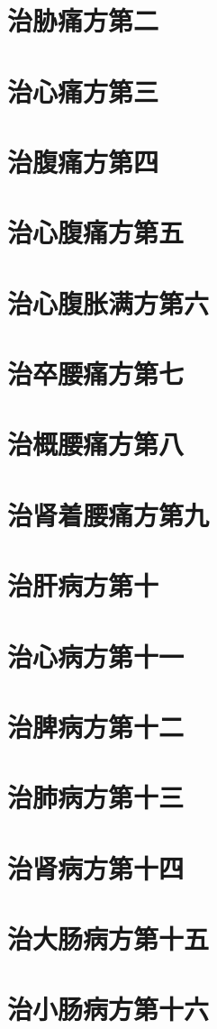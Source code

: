 \documentclass[a4paper,12pt,UTF8,twoside]{ctexbook}
\begin{document}
\chapter{治胁痛方第二}
\chapter{治心痛方第三}
\chapter{治腹痛方第四}
\chapter{治心腹痛方第五}
\chapter{治心腹胀满方第六}
\chapter{治卒腰痛方第七}
\chapter{治概腰痛方第八}
\chapter{治肾着腰痛方第九}
\chapter{治肝病方第十}
\chapter{治心病方第十一}
\chapter{治脾病方第十二}
\chapter{治肺病方第十三}
\chapter{治肾病方第十四}
\chapter{治大肠病方第十五}
\chapter{治小肠病方第十六}
\end{document}
